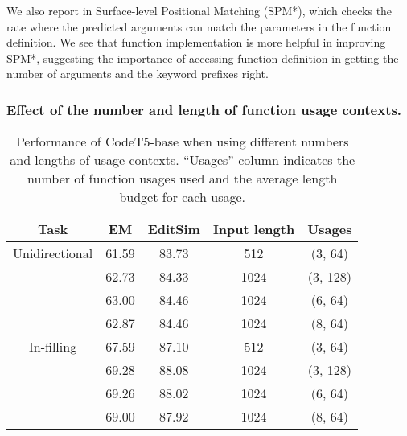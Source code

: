 We also report in  Surface-level Positional Matching (SPM*), which checks the rate where the predicted arguments can match the parameters in the function definition.
We see that function implementation is more helpful in improving SPM*, suggesting the importance of accessing function definition in getting the number of arguments and the keyword prefixes right.


\subsubsection{Effect of the number and length of function usage contexts.}





\begin{table}[ht]
\centering
\small
\begin{tabular}{ccccc}
\toprule
Task           & EM   & EditSim & Input length & Usages \\
\midrule
Unidirectional & 61.59 & 83.73 & 512 & (3, 64)  \\
               & 62.73 & 84.33 & 1024 & (3, 128) \\
               & 63.00 & 84.46 & 1024 & (6, 64) \\
               & 62.87 & 84.46 & 1024 & (8, 64) \\
\midrule
In-filling     & 67.59 & 87.10 & 512 & (3, 64)  \\
               & 69.28 & 88.08 & 1024 & (3, 128) \\
               & 69.26 & 88.02 & 1024 & (6, 64) \\
               & 69.00 & 87.92 & 1024 & (8, 64) \\
\bottomrule
\end{tabular}
\caption{Performance of CodeT5-base when using different numbers and lengths of usage contexts. ``Usages'' column indicates the number of function usages used and the average length budget for each usage.}
\label{tab:fc_length}
\end{table}

